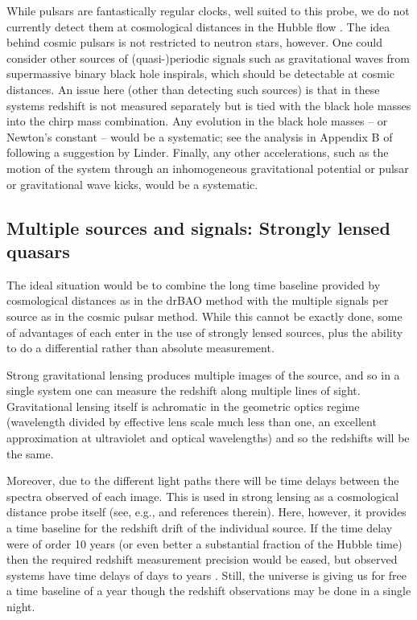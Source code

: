 \documentclass[preprint2, 10pt]{aastex}
\begin{document}
While pulsars are fantastically regular clocks, well suited to this probe, 
we do not currently detect them at cosmological distances in the Hubble 
flow \citep[but see][]{13071628}.  The idea behind cosmic pulsars is not 
restricted to neutron stars, however.  
One could consider other sources of (quasi-)periodic signals such as 
gravitational waves from supermassive binary black hole inspirals, which 
should be detectable 
at cosmic distances.  An issue here (other than detecting such sources) 
is that in these systems redshift is not measured separately but is tied 
with the black hole masses into the chirp mass combination.  Any evolution 
in the black hole masses -- or Newton's constant -- would be a systematic; 
see the analysis in Appendix B of \citet{09122724} following a suggestion 
by Linder.  Finally, any other accelerations, such as the motion of the system 
through an inhomogeneous gravitational potential or pulsar or gravitational 
wave kicks, would be a systematic. 


\subsection{Multiple sources and signals: Strongly lensed quasars} \label{sec:lens} 

The ideal situation would be to combine the long time baseline provided 
by cosmological distances as in the drBAO method with the multiple 
signals per source as in the cosmic pulsar method.  While this cannot be 
exactly done, some of advantages of each enter in the use of strongly 
lensed sources, plus the ability to do a differential rather than absolute 
measurement. 

Strong gravitational lensing produces multiple images of the source, 
and so in a single system one can measure the redshift along multiple 
lines of sight.  Gravitational lensing itself is achromatic in the 
geometric optics regime (wavelength divided by effective lens scale 
much less than one, an excellent approximation at ultraviolet and optical 
wavelengths) 
and so the redshifts will be the same. 

Moreover, due to the different light paths there will be time delays 
between the spectra observed of each image.  This is used in strong 
lensing as a cosmological distance probe itself (see, e.g., \citet{13061272} 
and references therein).  Here, however, it provides a time baseline for 
the redshift drift of the individual source.  If the time delay were of 
order 10 years (or even better a substantial fraction of the Hubble time) 
then the required redshift measurement precision would be eased, but 
observed systems have time delays of days to years 
\citep{2007ApJ...662...62F,2008ApJ...676..761F, 2013ApJ...764..186F}.  
Still, the universe 
is giving us for free a time baseline of a year though the redshift 
observations may be done in a single night.  
\end{document}
